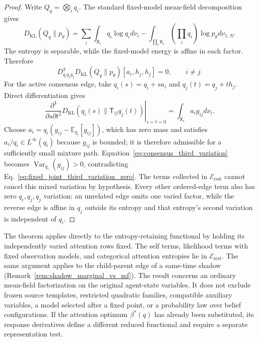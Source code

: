 \begin{proof}
Write $Q_q=\bigotimes_iq_i$. The standard fixed-model mean-field decomposition~\cite{Wainwright2008} gives
\begin{equation}
D_{\mathrm{KL}}(Q_q\|p_\theta)
=\sum_i\int_{\mathsf{X}_i}q_i\log q_i d\nu_i
-\int_{\prod_i\mathsf{X}_i}\left(\prod_iq_i\right)\log p_\theta d\nu_{1:N}.
\label{eq:fixed_joint_mean_field_structure}
\end{equation}
The entropy is separable, while the fixed-model energy is affine in each factor. Therefore
\begin{equation}
D^3_{q_iq_jq_j}D_{\mathrm{KL}}(Q_q\|p_\theta)[a_i,h_j,h_j]=0,
\qquad i\ne j.
\label{eq:fixed_joint_third_variation_zero}
\end{equation}
For the active consensus edge, take $q_i(s)=q_i+s a_i$ and $q_j(t)=q_j+t h_j$. Direct differentiation gives
\begin{equation}
\left.
\frac{\partial^3}{\partial s\partial t^2}
D_{\mathrm{KL}}(q_i(s)\|\mathsf{T}_{ij}q_j(t))
\right|_{s=t=0}
=\int_{\mathsf{X}_i}a_i g_{ij}d\nu_i.
\label{eq:consensus_third_variation}
\end{equation}
Choose $a_i=q_i(g_{ij}-\mathbb{E}_{q_i}[g_{ij}])$, which has zero mass and satisfies $a_i/q_i\in L^\infty(q_i)$ because $g_{ij}$ is bounded; it is therefore admissible for a sufficiently small mixture path. Equation~\eqref{eq:consensus_third_variation} becomes $\operatorname{Var}_{q_i}(g_{ij})>0$, contradicting Eq.~\eqref{eq:fixed_joint_third_variation_zero}. The terms collected in $\mathcal{E}_{\mathrm{rest}}$ cannot cancel this mixed variation by hypothesis. Every other ordered-edge term also has zero $q_i,q_j,q_j$ variation: an unrelated edge omits one varied factor, while the reverse edge is affine in $q_j$ outside its entropy and that entropy's second variation is independent of $q_i$.
\end{proof}

\begin{remark}
\label{rem:state_level_elbo_nogo_scope}
The theorem applies directly to the entropy-retaining functional by holding its independently varied attention rows fixed. The self terms, likelihood terms with fixed observation models, and categorical attention entropies lie in $\mathcal{E}_{\mathrm{rest}}$. The same argument applies to the child-parent edge of a same-time shadow (Remark~\ref{rem:shadow_marginal_vs_mf}). The result concerns an ordinary mean-field factorization on the original agent-state variables. It does not exclude frozen source templates, restricted quadratic families, compatible auxiliary variables, a model selected after a fixed point, or a probability law over belief configurations. If the attention optimum $\beta^*(q)$ has already been substituted, its response derivatives define a different reduced functional and require a separate representation test.
\end{remark}

